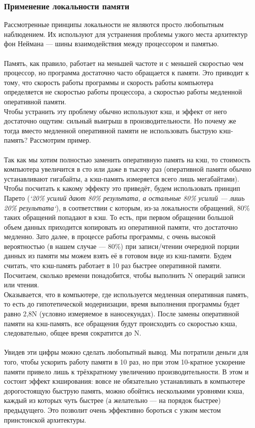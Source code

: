 \subsubsection{Применение локальности памяти}\label{subsubsec:memory-locality-application}

Рассмотренные принципы локальности не являются просто любопытным наблюдением. Их используют для устранения проблемы узкого места архитектур фон Неймана --- шины взаимодействия между процессором и памятью.
\\
\\ Память, как правило, работает на меньшей частоте и с меньшей скоростью чем процессор, но программа достаточно часто обращается к памяти. Это приводит к тому, что скорость работы программы и скорость работы компьютера определяется не скоростью работы процессора, а скоростью работы медленной оперативной памяти.
\\Чтобы устранить эту проблему обычно используют кэш, и эффект от него достаточно ощутим: сильный выигрыш в производительности.
Но почему же тогда вместо медленной оперативной памяти не использовать быструю кэш-память? Рассмотрим пример.
\\
\\Так как мы хотим полностью заменить оперативную память на кэш, то стоимость компьютера увеличится в сто или даже в тысячу раз (оперативной памяти обычно устанавливают гигабайты, а кэш-память измеряется всего лишь мегабайтами).
\\Чтобы посчитать к какому эффекту это приведёт, будем использовать принцип Парето (\emph{`20\% усилий дают 80\% результата, а остальные 80\% усилий --- лишь 20\% результата`}), в соответствии с которым, из-за локальности обращений, 80\% таких обращений попадают в кэш. То есть, при первом обращении большой объем данных приходится копировать из оперативной памяти, что достаточно медленно. Зато далее, в процессе работы программы, с очень высокой вероятностью (в нашем случае --- 80\%) при записи/чтении очередной порции данных из памяти мы можем взять её в готовом виде из кэш-памяти. Будем считать, что кэш-память работает в 10 раз быстрее оперативной памяти.
\\Посчитаем, сколько времени понадобится, чтобы выполнить N операций записи или чтения.
\\Оказывается, что в компьютере, где используется медленная оперативная память, то есть до гипотетической модернизации, время выполнения программы будет равно 2,8N (условно измеряемое в наносекундах).
После замены оперативной памяти на кэш-память, все обращения будут происходить со скоростью кэша, следовательно, общее время сократится до N.
\\
\\
Увидев эти цифры можно сделать любопытный вывод. Мы потратили деньги для того, чтобы ускорить работу памяти в 10 раз, но при этом 10-кратное ускорение памяти привело лишь к трёхкратному увеличению производительности.
В этом и состоит эффект кэширования: вовсе не обязательно устанавливать в компьютере дорогостоящую быструю память, можно обойтись несколькими уровнями кэша, каждый из которых чуть быстрее (а желательно --- на порядок быстрее) предыдущего. Это позволит очень эффективно бороться с узким местом принстонской архитектуры.
